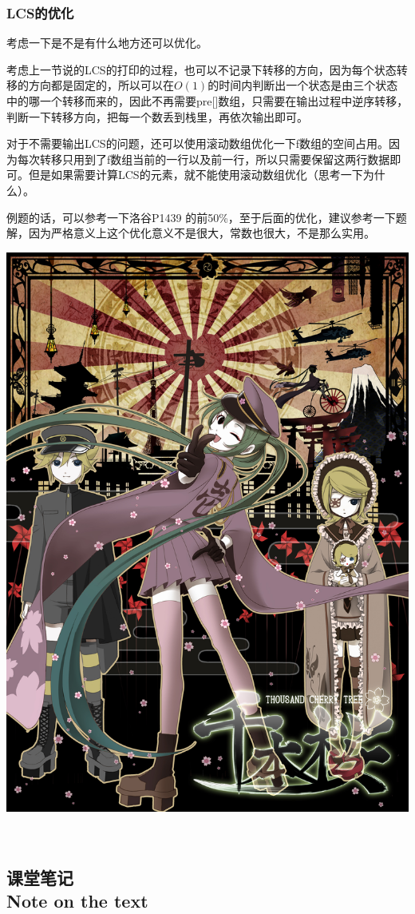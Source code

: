 \documentclass{article}
\theoremstyle{nonumberplain}
\newcommand{\note}{\ \par
	\subsection*{课堂笔记\\\tiny{Note on the text}}
	\newpage}
\begin{document}
\subsubsection{LCS的优化}
考虑一下是不是有什么地方还可以优化。

考虑上一节说的LCS的打印的过程，也可以不记录下转移的方向，因为每个状态转移的方向都是固定的，所以可以在$O(1)$的时间内判断出一个状态是由三个状态中的哪一个转移而来的，因此不再需要pre[]数组，只需要在输出过程中逆序转移，判断一下转移方向，把每一个数丢到栈里，再依次输出即可。

对于不需要输出LCS的问题，还可以使用滚动数组优化一下f数组的空间占用。因为每次转移只用到了f数组当前的一行以及前一行，所以只需要保留这两行数据即可。但是如果需要计算LCS的元素，就不能使用滚动数组优化（思考一下为什么）。

例题的话，可以参考一下洛谷P1439 的前50\%，至于后面的优化，建议参考一下题解，因为严格意义上这个优化意义不是很大，常数也很大，不是那么实用。
\begin{center}\includegraphics[scale=0.08]{21804232_p0.jpg}\end{center}
\note
\end{document}
